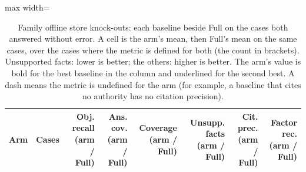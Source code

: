 \begin{table}[t]
\centering\footnotesize
\begin{adjustbox}{max width=\textwidth}
\begin{tabular}{@{}lrrrrrrr@{}}
\toprule
Arm & Cases & Obj. recall (arm / Full) & Ans. cov. (arm / Full) & Coverage (arm / Full) & Unsupp. facts (arm / Full) & Cit. prec. (arm / Full) & Factor rec. (arm / Full) \\
\midrule
\bottomrule
\end{tabular}
\end{adjustbox}
\caption{Family offline store knock-outs: each baseline beside Full on the cases both answered without error. A cell is the arm's mean, then Full's mean on the same cases, over the cases where the metric is defined for both (the count in brackets). Unsupported facts: lower is better; the others: higher is better. The arm's value is bold for the best baseline in the column and underlined for the second best. A dash means the metric is undefined for the arm (for example, a baseline that cites no authority has no citation precision).}
\label{tab:main_shravani_off}
\end{table}